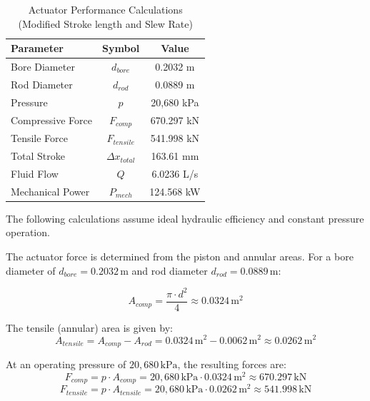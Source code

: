 \documentclass[
bindingoffset=5mm,  %
footnoteindent=3mm, %
hyphenation=true    %
]{src/wut-thesis}
\begin{document}
	\begin{table}[htbp]
		\centering
		\begin{tabular}{l c c}
			\toprule
			Parameter &Symbol &Value \\
			\midrule
			Bore Diameter & $d_{bore}$ & 0.2032 m \\
			Rod Diameter & $d_{rod}$ &0.0889 m \\
			Pressure & $p$&20,680 kPa \\
			Compressive Force&$F_{comp}$ & 670.297 kN \\
			Tensile Force&$F_{tensile}$  & 541.998 kN \\
			Total Stroke &$\Delta{x_{total}}$ &163.61 mm \\
			Fluid Flow & $Q$&6.0236 L/s \\
			Mechanical Power&$P_{mech}$ & 124.568 kW \\
			\bottomrule
		\end{tabular}
		\caption{Actuator Performance Calculations (Modified Stroke length and Slew Rate)}
		\label{tab:actuator_performance}
	\end{table}
	
	The following calculations assume ideal hydraulic efficiency and constant pressure operation.
	
	The actuator force is determined from the piston and annular areas. For a bore diameter of $d_{bore} = 0.2032\,\text{m}$ and rod diameter $d_{rod} = 0.0889\,\text{m}$:
	
	\begin{equation}
		A_{comp} = \frac{\pi \cdot d^2}{4}\approx 0.0324\,\text{m}^2
	\end{equation}
	
	The tensile (annular) area is given by:
	\begin{equation}
		A_{tensile} = A_{comp}- A_{rod} = 0.0324\,\text{m}^2 - 0.0062\,\text{m}^2 \approx 0.0262\,\text{m}^2
	\end{equation}
	
	At an operating pressure of $20,680\,\text{kPa}$, the resulting forces are:
	\begin{equation}
		F_{comp} = p \cdot A_{comp} = 20,680\,\text{kPa} \cdot 0.0324\,\text{m}^2 \approx 670.297\,\text{kN}
	\end{equation}
	\begin{equation}
		F_{tensile} = p \cdot A_{tensile} = 20,680\,\text{kPa} \cdot 0.0262\,\text{m}^2 \approx 541.998\,\text{kN}
	\end{equation}
	
\end{document}
